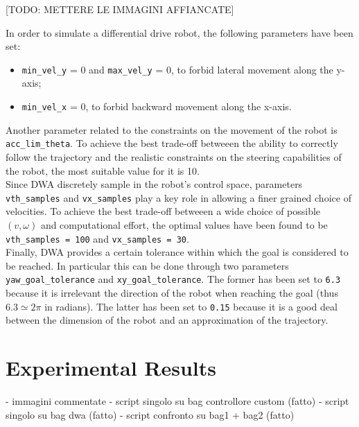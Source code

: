 \documentclass[11pt,a4paper]{article}
\begin{document}
[TODO: METTERE LE IMMAGINI AFFIANCATE]

In order to simulate a differential drive robot, the following parameters have been set:

\begin{itemize}
    \item \texttt{min\_vel\_y} = 0 and \texttt{max\_vel\_y} = 0, to forbid lateral movement along the y-axis;
    \item \texttt{min\_vel\_x} = 0, to forbid backward movement along the x-axis.\\
\end{itemize}

Another parameter related to the constraints on the movement of the robot is \texttt{acc\_lim\_theta}.
To achieve the best trade-off betweeen the ability to correctly follow the trajectory and the realistic
constraints on the steering capabilities of the robot, the most suitable value for it is 10.\\

Since DWA discretely sample in the robot's control space, parameters \texttt{vth\_samples} and \texttt{vx\_samples}
play a key role in allowing a finer grained choice of velocities.
To achieve the best trade-off betweeen a wide choice of possible $(v,\omega)$ and computational effort,
the optimal values have been found to be \texttt{vth\_samples = 100} and \texttt{vx\_samples = 30}.\\

Finally, DWA provides a certain tolerance within which the goal is considered to be reached.
In particular this can be done through two parameters \texttt{yaw\_goal\_tolerance} and \texttt{xy\_goal\_tolerance}.
The former has been set to \texttt{6.3} because it is irrelevant the direction of the robot when reaching the goal
(thus $6.3 \simeq 2\pi$ in radians).
The latter has been set to \texttt{0.15} because it is a good deal between the dimension of the robot and
an approximation of the trajectory.



\section{Experimental Results}

- immagini commentate
    - script singolo su bag controllore custom (fatto)
    - script singolo su bag dwa (fatto)
    - script confronto su bag1 + bag2 (fatto)
\end{document}
